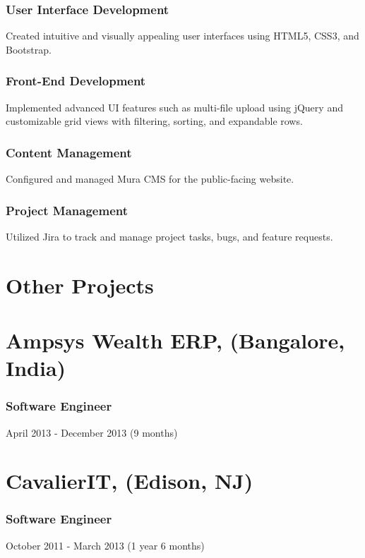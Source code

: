 \documentclass[letterpaper,9pt]{article}
\begin{document}
	\subsubsection{User Interface Development}{Created intuitive and visually appealing user interfaces using HTML5, CSS3, and Bootstrap.}
	\subsubsection{Front-End Development}{Implemented advanced UI features such as multi-file upload using jQuery and customizable grid views with filtering, sorting, and expandable rows.}
	\subsubsection{Content Management}{Configured and managed Mura CMS for the public-facing website.}
	\subsubsection{Project Management}{Utilized Jira to track and manage project tasks, bugs, and feature requests.}
	
	\pagebreak

    \section{Other Projects}

    
    \section{Ampsys Wealth ERP, (Bangalore, India)}
    \subsubsection{Software Engineer}{April 2013 - December 2013 (9 months)}

    
    \section{CavalierIT, (Edison, NJ)}
    \subsubsection{Software Engineer}{October 2011 - March 2013 (1 year 6 months)}
\end{document}
